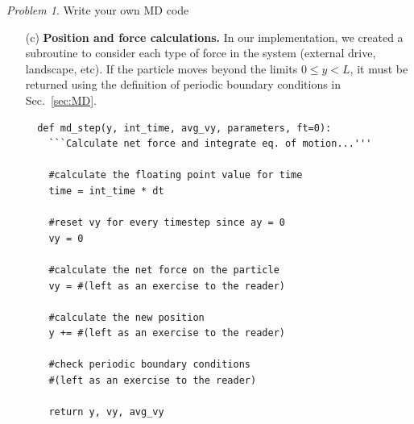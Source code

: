 \documentclass[preprint,showpacs,preprintnumbers,amsmath,amssymb,aps,prb]{revtex4-1}
\theoremstyle{remark}
\newtheorem{problem}{Problem}
\begin{document}
\begin{problem}{Write your own MD code}
\begin{enumerate}
\begin{verbatim}
    #loop through the integer time steps in the simulation
    for int_time in range(0,maxtime):
        #(left as an exercise to the reader)
        time += dt
      
\end{verbatim}

{\it Comment:}     
     A key decision for any MD algorithm
     is how much information to save during and after
     the simulation.
     We define the following constants
     to manage the length of arrays
     containing data.
     We found in practice that for 
     short simulations times
     we could save all data.

\begin{verbatim}
#integer time steps
dict[`maxtime']=int(40/dict['freq'])   #total time steps 
dict[`writemovietime']=1   #write data to arrays for plotting
\end{verbatim}

\item[(c)] {\bf Position and force calculations.}
  In our implementation,
  we created a subroutine to consider each
  type of force in the system (external drive, landscape, etc).
  If the particle moves beyond the limits
  $0 \le y < L$,
  it must be returned 
  using the definition of periodic boundary conditions
  in Sec.~\ref{sec:MD}.

\begin{verbatim}
  def md_step(y, int_time, avg_vy, parameters, ft=0):
    ```Calculate net force and integrate eq. of motion...'''

    #calculate the floating point value for time
    time = int_time * dt

    #reset vy for every timestep since ay = 0 
    vy = 0 

    #calculate the net force on the particle
    vy = #(left as an exercise to the reader)

    #calculate the new position
    y += #(left as an exercise to the reader)

    #check periodic boundary conditions
    #(left as an exercise to the reader)

    return y, vy, avg_vy

\end{verbatim}


\end{enumerate}
\end{problem}
\end{document}
